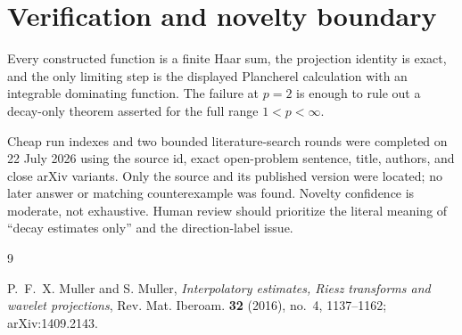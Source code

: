 \documentclass[11pt]{article}
\newcommand{\1}{\mathbf 1}
\begin{document}
\section{Verification and novelty boundary}

Every constructed function is a finite Haar sum, the projection identity is
exact, and the only limiting step is the displayed Plancherel calculation
with an integrable dominating function. The failure at $p=2$ is enough to
rule out a decay-only theorem asserted for the full range $1<p<\infty$.

Cheap run indexes and two bounded literature-search rounds were completed on
22 July 2026 using the source id, exact open-problem sentence, title, authors,
and close arXiv variants. Only the source and its published version were
located; no later answer or matching counterexample was found. Novelty
confidence is moderate, not exhaustive. Human review should prioritize the
literal meaning of ``decay estimates only'' and the direction-label issue.

\begin{thebibliography}{9}

P.~F.~X. Muller and S. Muller,
\emph{Interpolatory estimates, Riesz transforms and wavelet projections},
Rev. Mat. Iberoam. \textbf{32} (2016), no.~4, 1137--1162;
arXiv:1409.2143.

\end{thebibliography}
\end{document}
